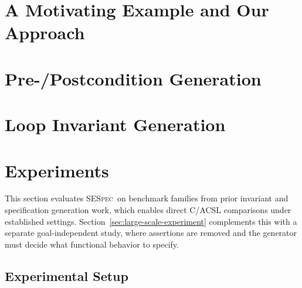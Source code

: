 \documentclass[lettersize,journal]{IEEEtran}
\newcommand{\toolname}{\textsc{SESpec}}
\begin{document}
\section{A Motivating Example and Our Approach}
\label{sec:motivation}





\section{Pre-/Postcondition Generation}
\label{sec:summarygeneration}







\section{Loop Invariant Generation}
\label{sec:loopinvariant}








\section{Experiments}
\label{sec:experiments}

This section evaluates \toolname\ on benchmark families from prior invariant and specification generation work, which enables direct C/ACSL comparisons under established settings. Section~\ref{sec:large-scale-experiment} complements this with a separate goal-independent study, where assertions are removed and the generator must decide what functional behavior to specify.

\subsection{Experimental Setup}
\end{document}
